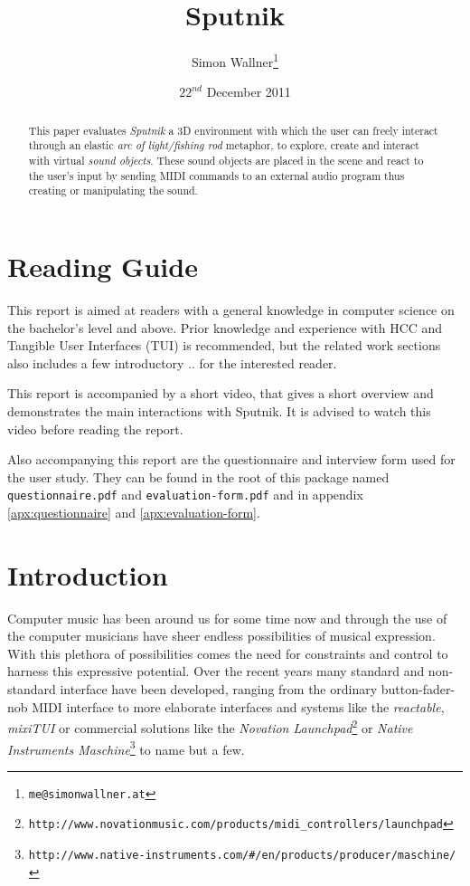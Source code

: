 \documentclass[10pt,a4paper]{scrartcl}
\title{Sputnik}
\author{Simon Wallner\footnote{\texttt{me@simonwallner.at}}}
\date{$22^{nd}$ December 2011}
\begin{document}
\maketitle

\begin{abstract}
This paper evaluates \emph{Sputnik} a 3D environment with which the user can freely interact through an elastic \emph{arc of light/fishing rod} metaphor, to explore, create and interact with virtual \emph{sound objects}. These sound objects are placed in the scene and react to the user's input by sending MIDI commands to an external audio program thus creating or manipulating the sound.

\end{abstract}

\section{Reading Guide}
This report is aimed at readers with a general knowledge in computer science on the bachelor's level and above. Prior knowledge and experience with HCC and Tangible User Interfaces (TUI) is recommended, but the related work sections also includes a few introductory .. for the interested reader.

This report is accompanied by a short video, that gives a short overview and demonstrates the main interactions with Sputnik. It is advised to watch this video before reading the report. 

Also accompanying this report are the questionnaire and interview form used for the user study. They can be found in the root of this package named \texttt{questionnaire.pdf} and \texttt{evaluation-form.pdf} and in appendix \ref{apx:questionnaire} and \ref{apx:evaluation-form}.


\section{Introduction}

Computer music has been around us for some time now and through the use of the computer musicians have sheer endless possibilities of musical expression. With this plethora of possibilities comes the need for constraints and control to harness this expressive potential. Over the recent years many standard and non-standard interface have been developed, ranging from the ordinary button-fader-nob MIDI interface to more elaborate interfaces and systems like the \emph{reactable}\citep{Jorda2007}, \emph{mixiTUI}\citep{Pedersen2009} or commercial solutions like the \emph{Novation Launchpad}\footnote{\texttt{http://www.novationmusic.com/products/midi\_controllers/launchpad}} or \emph{Native Instruments Maschine}\footnote{\texttt{http://www.native-instruments.com/\#/en/products/producer/maschine/}} to name but a few.
\end{document}
